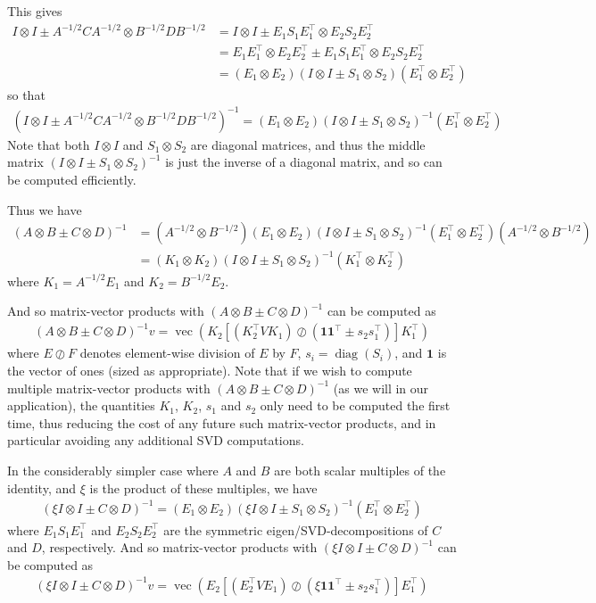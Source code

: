 \documentclass[12pt]{article}
\newcommand{\ovec}{\operatorname{vec}}
\newcommand{\diag}{\operatorname{diag}}
\begin{document}
This gives
\begin{align*}
I \otimes I \pm A^{-1/2}CA^{-1/2} \otimes B^{-1/2}DB^{-1/2} &= I \otimes I \pm E_1 S_1 E_1^\top \otimes E_2 S_2 E_2^\top \\
&= E_1 E_1^\top \otimes E_2 E_2^\top \pm E_1 S_1 E_1^\top \otimes E_2 S_2 E_2^\top \\
&= (E_1 \otimes E_2)(I \otimes I \pm S_1  \otimes S_2)(E_1^\top \otimes E_2^\top)
\end{align*}
so that
\begin{align*}
(I \otimes I \pm A^{-1/2}CA^{-1/2} \otimes B^{-1/2}DB^{-1/2})^{-1} = (E_1 \otimes E_2)(I \otimes I \pm S_1 \otimes S_2)^{-1}(E_1^\top \otimes E_2^\top)
\end{align*}
Note that both $I \otimes I$ and $S_1 \otimes S_2$ are diagonal matrices, and thus the middle matrix $(I \otimes I \pm S_1 \otimes S_2)^{-1}$ is just the inverse of a diagonal matrix, and so can be computed efficiently.

Thus we have
\begin{align*}
(A \otimes B \pm C \otimes D)^{-1} &= (A^{-1/2} \otimes B^{-1/2})(E_1 \otimes E_2)(I \otimes I \pm S_1 \otimes S_2)^{-1}(E_1^\top \otimes E_2^\top)(A^{-1/2} \otimes B^{-1/2}) \\
&= (K_1 \otimes K_2)(I \otimes I \pm S_1 \otimes S_2)^{-1}(K_1^\top \otimes K_2^\top)
\end{align*}
where $K_1 = A^{-1/2} E_1$ and $K_2 = B^{-1/2} E_2$.

And so matrix-vector products with $(A \otimes B \pm C \otimes D)^{-1}$ can be computed as
\begin{align*}
(A \otimes B \pm C \otimes D)^{-1} v = \ovec\left (  K_2 \left[ (K_2^\top V K_1) \oslash \left (\mathbf{1}\mathbf{1}^\top \pm s_2 s_1^\top \right) \right] K_1^\top  \right)
\end{align*}
where $E \oslash F$ denotes element-wise division of $E$ by $F$, $s_i = \diag(S_i)$, and $\mathbf{1}$ is the vector of ones (sized as appropriate).  Note that if we wish to compute multiple matrix-vector products with $(A \otimes B \pm C \otimes D)^{-1}$ (as we will in our application), the quantities $K_1$, $K_2$, $s_1$ and $s_2$ only need to be computed the first time, thus reducing the cost of any future such matrix-vector products, and in particular avoiding any additional SVD computations.

In the considerably simpler case where $A$ and $B$ are both scalar multiples of the identity, and $\xi$ is the product of these multiples, we have
\begin{align*}
(\xi I \otimes I \pm C \otimes D)^{-1} = (E_1 \otimes E_2)(\xi I \otimes I \pm S_1 \otimes S_2)^{-1}(E_1^\top \otimes E_2^\top)
\end{align*}
where $E_1 S_1 E_1^\top$ and $E_2 S_2 E_2^\top$ are the symmetric eigen/SVD-decompositions of $C$ and $D$, respectively.  And so matrix-vector products with $(\xi I \otimes I \pm C \otimes D)^{-1}$ can be computed as
\begin{align*}
(\xi I \otimes I \pm C \otimes D)^{-1} v = \ovec\left (  E_2 \left[ (E_2^\top V E_1) \oslash \left (\xi \mathbf{1}\mathbf{1}^\top \pm s_2 s_1^\top \right) \right] E_1^\top  \right)
\end{align*}
\end{document}
